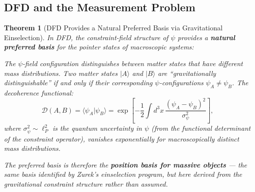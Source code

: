 \documentclass[11pt,a4paper]{article}
\newtheorem{theorem}{Theorem}
\begin{document}
\subsection{DFD and the Measurement Problem}

\begin{theorem}[DFD Provides a Natural Preferred Basis via Gravitational Einselection]
\label{thm:preferred-basis}
In DFD, the constraint-field structure of $\psi$ provides a \textbf{natural preferred basis} for the pointer states of macroscopic systems:

The $\psi$-field configuration distinguishes between matter states that have different mass distributions. Two matter states $|A\rangle$ and $|B\rangle$ are ``gravitationally distinguishable'' if and only if their corresponding $\psi$-configurations $\psi_A \neq \psi_B$. The decoherence functional:
\begin{equation}
\mathcal{D}(A,B) = \langle\psi_A|\psi_B\rangle = \exp\left[-\frac{1}{2}\int d^3x\,\frac{(\psi_A - \psi_B)^2}{\sigma_\psi^2}\right],
\end{equation}
where $\sigma_\psi^2 \sim \ell_P^2$ is the quantum uncertainty in $\psi$ (from the functional determinant of the constraint operator), vanishes exponentially for macroscopically distinct mass distributions.

The preferred basis is therefore the \textbf{position basis for massive objects} --- the same basis identified by Zurek's einselection program, but here derived from the gravitational constraint structure rather than assumed.
\end{theorem}
\end{document}
